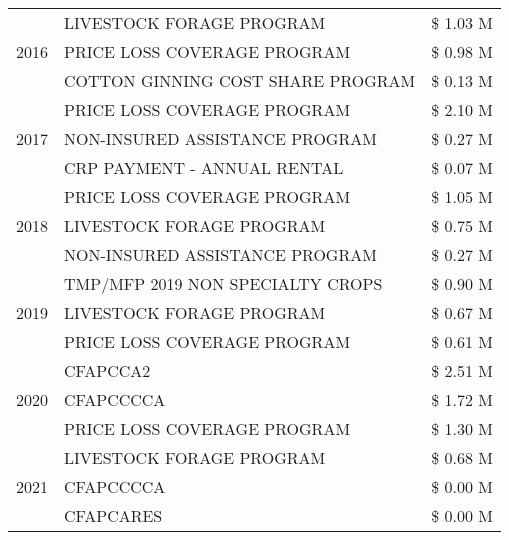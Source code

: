 \begin{tabular}{llr}
\multirow[t]{3}{*}{2016} & LIVESTOCK FORAGE PROGRAM & \$ 1.03 M \\
 & PRICE LOSS COVERAGE PROGRAM & \$ 0.98 M \\
 & COTTON GINNING COST SHARE PROGRAM & \$ 0.13 M \\
\cline{1-3}
\multirow[t]{3}{*}{2017} & PRICE LOSS COVERAGE PROGRAM & \$ 2.10 M \\
 & NON-INSURED ASSISTANCE PROGRAM & \$ 0.27 M \\
 & CRP PAYMENT - ANNUAL RENTAL & \$ 0.07 M \\
\cline{1-3}
\multirow[t]{3}{*}{2018} & PRICE LOSS COVERAGE PROGRAM & \$ 1.05 M \\
 & LIVESTOCK FORAGE PROGRAM & \$ 0.75 M \\
 & NON-INSURED ASSISTANCE PROGRAM & \$ 0.27 M \\
\cline{1-3}
\multirow[t]{3}{*}{2019} & TMP/MFP 2019 NON SPECIALTY CROPS & \$ 0.90 M \\
 & LIVESTOCK FORAGE PROGRAM & \$ 0.67 M \\
 & PRICE LOSS COVERAGE PROGRAM & \$ 0.61 M \\
\cline{1-3}
\multirow[t]{3}{*}{2020} & CFAPCCA2 & \$ 2.51 M \\
 & CFAPCCCCA & \$ 1.72 M \\
 & PRICE LOSS COVERAGE PROGRAM & \$ 1.30 M \\
\cline{1-3}
\multirow[t]{3}{*}{2021} & LIVESTOCK FORAGE PROGRAM & \$ 0.68 M \\
 & CFAPCCCCA & \$ 0.00 M \\
 & CFAPCARES & \$ 0.00 M \\
\cline{1-3}
\bottomrule
\end{tabular}

